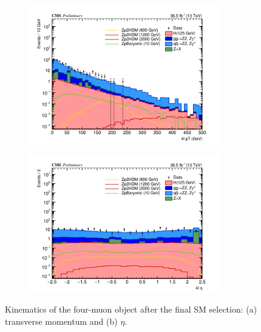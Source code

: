 \begin{figure}[tbh]
\begin{subfigure}{0.50\textwidth}
\centering
\includegraphics[width=3.3in]{figures/hist_hpt4l_CR.png}
\caption{}
\end{subfigure}
\begin{subfigure}{0.50\textwidth}
\centering
\includegraphics[width=3.3in]{figures/hist_heta4l_CR.png}
\caption{}
\end{subfigure}
\caption{Kinematics of the four-muon object after the final SM selection: (a) transverse momentum and (b) $\eta$.}
\label{fig:4mukin}
\end{figure}

